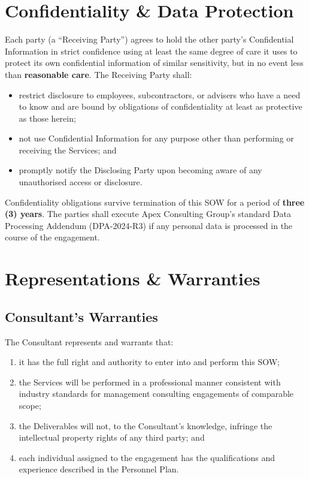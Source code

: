 
\section{Confidentiality \& Data Protection}

Each party (a ``Receiving Party'') agrees to hold the other party's Confidential
Information in strict confidence using at least the same degree of care it uses to
protect its own confidential information of similar sensitivity, but in no event less
than \textbf{reasonable care}. The Receiving Party shall:

\begin{itemize}
  \item restrict disclosure to employees, subcontractors, or advisers who have a
    need to know and are bound by obligations of confidentiality at least as
    protective as those herein;
  \item not use Confidential Information for any purpose other than performing or
    receiving the Services; and
  \item promptly notify the Disclosing Party upon becoming aware of any unauthorised
    access or disclosure.
\end{itemize}

Confidentiality obligations survive termination of this SOW for a period of
\textbf{three (3) years}. The parties shall execute Apex Consulting Group's standard
Data Processing Addendum (DPA-2024-R3) if any personal data is processed in the
course of the engagement.

\section{Representations \& Warranties}

\subsection{Consultant's Warranties}

The Consultant represents and warrants that:

\begin{enumerate}[label=(\roman*)]
  \item it has the full right and authority to enter into and perform this SOW;
  \item the Services will be performed in a professional manner consistent with
    industry standards for management consulting engagements of comparable scope;
  \item the Deliverables will not, to the Consultant's knowledge, infringe the
    intellectual property rights of any third party; and
  \item each individual assigned to the engagement has the qualifications and
    experience described in the Personnel Plan.
\end{enumerate}

